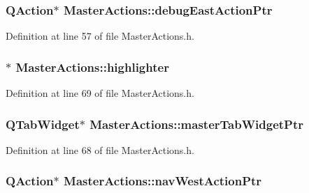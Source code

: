 \hypertarget{class_master_actions_ab26f3e610cb9e303ac3a987964dfac19}{
\subsubsection[{debug\-East\-Action\-Ptr}]{\setlength{\rightskip}{0pt plus 5cm}Q\-Action$\ast$ Master\-Actions\-::debug\-East\-Action\-Ptr\hspace{0.3cm}{\ttfamily [private]}}}\label{class_master_actions_ab26f3e610cb9e303ac3a987964dfac19}


Definition at line 57 of file Master\-Actions.\-h.

\hypertarget{class_master_actions_a50b1565db8b7780ec4e88e59953aa67b}{
\subsubsection[{highlighter}]{$\ast$ Master\-Actions\-::highlighter\hspace{0.3cm}{\ttfamily [private]}}}\label{class_master_actions_a50b1565db8b7780ec4e88e59953aa67b}


Definition at line 69 of file Master\-Actions.\-h.

\hypertarget{class_master_actions_a774ef398053050c37d62b7a24e61c7ee}{
\subsubsection[{master\-Tab\-Widget\-Ptr}]{\setlength{\rightskip}{0pt plus 5cm}Q\-Tab\-Widget$\ast$ Master\-Actions\-::master\-Tab\-Widget\-Ptr\hspace{0.3cm}{\ttfamily [private]}}}\label{class_master_actions_a774ef398053050c37d62b7a24e61c7ee}


Definition at line 68 of file Master\-Actions.\-h.

\hypertarget{class_master_actions_af1e3c333e90f4763dfd964aa2321b034}{
\subsubsection[{nav\-West\-Action\-Ptr}]{\setlength{\rightskip}{0pt plus 5cm}Q\-Action$\ast$ Master\-Actions\-::nav\-West\-Action\-Ptr\hspace{0.3cm}{\ttfamily [private]}}}\label{class_master_actions_af1e3c333e90f4763dfd964aa2321b034}


